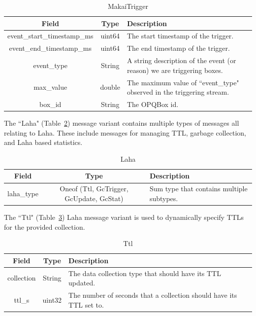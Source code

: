 \begin{table}[H]
	\centering
	\caption{MakaiTrigger}
	\begin{tabular}{|c|c|p{8cm}|}
		\hline
		Field & Type & Description  \\
		\hline
		event\_start\_timestamp\_ms & uint64  & The start timestamp of the trigger. \\
		\hline
		event\_end\_timestamp\_ms & uint64 & The end timestamp of the trigger. \\
		\hline
		event\_type & String & A string description of the event (or reason) we are triggering boxes. \\
		\hline
		max\_value & double & The maximum value of ``event\_type" observed in the triggering stream. \\
		\hline
		box\_id & String & The OPQBox id. \\
		\hline
	\end{tabular}
	\label{table:MakaiTrigger}
\end{table}

The ``Laha" (Table~\ref{table:Laha}) message variant contains multiple types of messages all relating to Laha. These include messages for managing TTL, garbage collection, and Laha based statistics.

\begin{table}[H]
	\centering
	\caption{Laha}
	\begin{tabular}{|c|c|p{8cm}|}
		\hline
		Field & Type & Description  \\
		\hline
		laha\_type & Oneof (Ttl, GcTrigger, GcUpdate, GcStat) & Sum type that contains multiple subtypes. \\
		\hline
	\end{tabular}
	\label{table:Laha}
\end{table}

The ``Ttl" (Table~\ref{table:Ttl}) Laha message variant is used to dynamically specify TTLs for the provided collection.

\begin{table}[H]
	\centering
	\caption{Ttl}
	\begin{tabular}{|c|c|p{8cm}|}
		\hline
		Field & Type & Description  \\
		\hline
		collection & String & The data collection type that should have its TTL updated.  \\
		\hline
		ttl\_s & uint32 & The number of seconds that a collection should have its TTL set to. \\
		\hline
	\end{tabular}
	\label{table:Ttl}
\end{table}

